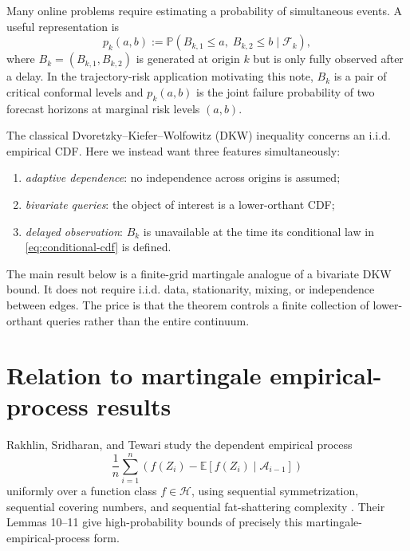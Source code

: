 \documentclass[11pt]{article}
\newcommand{\E}{\mathbb{E}}
\newcommand{\Pp}{\mathbb{P}}
\newcommand{\F}{\mathcal{F}}
\newcommand{\1}{\mathbf{1}}
\begin{document}
Many online problems require estimating a probability of simultaneous events.
A useful representation is
\begin{equation}
    p_k(a,b)
    :=
    \Pp\!\left(
        B_{k,1}\le a,\;B_{k,2}\le b
        \mid \F_k
    \right),
    \label{eq:conditional-cdf}
\end{equation}
where $B_k=(B_{k,1},B_{k,2})$ is generated at origin $k$ but is only fully
observed after a delay.  In the trajectory-risk application motivating this
note, $B_k$ is a pair of critical conformal levels and
$p_k(a,b)$ is the joint failure probability of two forecast horizons at
marginal risk levels $(a,b)$.

The classical Dvoretzky--Kiefer--Wolfowitz (DKW) inequality concerns an i.i.d.
empirical CDF.  Here we instead want three features simultaneously:
\begin{enumerate}[leftmargin=*]
    \item \emph{adaptive dependence}: no independence across origins is assumed;
    \item \emph{bivariate queries}: the object of interest is a lower-orthant CDF;
    \item \emph{delayed observation}: $B_k$ is unavailable at the time its
    conditional law in \eqref{eq:conditional-cdf} is defined.
\end{enumerate}

The main result below is a finite-grid martingale analogue of a bivariate DKW
bound.  It does not require i.i.d. data, stationarity, mixing, or independence
between edges.  The price is that the theorem controls a finite collection of
lower-orthant queries rather than the entire continuum.

\section{Relation to martingale empirical-process results}

Rakhlin, Sridharan, and Tewari study the dependent empirical process
\begin{equation}
    \frac1n\sum_{i=1}^n
    \left(
        f(Z_i)-\E[f(Z_i)\mid \mathcal A_{i-1}]
    \right)
    \label{eq:rst-process}
\end{equation}
uniformly over a function class $f\in\mathcal H$, using sequential
symmetrization, sequential covering numbers, and sequential fat-shattering
complexity \cite{rakhlin2015}.  Their Lemmas 10--11 give high-probability
bounds of precisely this martingale-empirical-process form.
\end{document}

